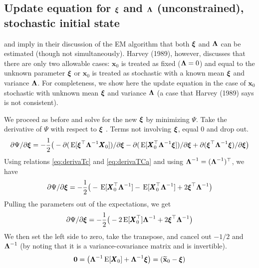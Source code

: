 \documentclass[]{article}
\def\xixi{\mbox{\boldmath $\xi$}}
\def\LAM{\mbox{\boldmath $\Lambda$}}
\def\E{\,\textup{\textrm{E}}}
\def\XX{\mbox{$\pmb{X}$}}	\def\xx{\mbox{$\pmb{x}$}}
\begin{document}
\subsection{Update equation for $\xixi$ and $\LAM$ (unconstrained), stochastic initial state}
\citet{ShumwayStoffer2006} and \citet{GhahramaniHinton1996} imply in their discussion of the EM algorithm that both $\xixi$ and $\LAM$ can be estimated (though not simultaneously).  Harvey (1989), however, discusses that there are only two allowable cases: $\xx_0$ is treated as fixed ($\LAM=0$) and equal to the unknown parameter $\xixi$ or $\xx_0$ is treated as stochastic with a known mean $\xixi$ and variance $\LAM$.  For completeness, we show here the update equation in the case of $\xx_0$ stochastic with unknown mean $\xixi$ and variance $\LAM$ (a case that Harvey (1989) says is not consistent).

We proceed as before and solve for the new $\xixi$ by minimizing $\Psi$.
Take the derivative of $\Psi$  with respect to $\xixi$ .  Terms not involving $\xixi$, equal 0 and drop out.  
\begin{equation}\label{eq:pi.unconstrained1}
\begin{split}
\partial\Psi/\partial\xixi = - \frac{1}{2} \big(-  \partial(\E[\xixi^\top\LAM^{-1}\XX_0])/\partial\xixi 
- \partial(\E[\XX_0^\top\LAM^{-1}\xixi])/\partial\xixi 
 + \partial(\xixi^\top\LAM^{-1}\xixi)/\partial\xixi \big)
\end{split}
\end{equation}
Using relations \eqref{eq:derivaTc} and \eqref{eq:derivaTCa} and using $\LAM^{-1} = (\LAM^{-1})^\top$, we have
\begin{equation}\label{eq:pi.unconstrained2}
\partial\Psi/\partial\xixi = - \frac{1}{2} \big(- \E[ \XX_0^\top\LAM^{-1} ] 
- \E[ \XX_0^\top\LAM^{-1} ] + 2\xixi^\top\LAM^{-1} \big)
\end{equation}
Pulling the parameters out of the expectations, we get
\begin{equation}\label{eq:pi.unconstrained3}
\partial\Psi/\partial\xixi = - \frac{1}{2} \big(- 2\E[ \XX_0^\top ]\LAM^{-1} + 2\xixi^\top\LAM^{-1} \big)
\end{equation}
We then set the left side to zero, take the transpose, and cancel out $-1/2$ and $\LAM^{-1}$ (by noting that it is a variance-covariance matrix and is invertible).   
\begin{equation}\label{eq:pi.unconstrained4}
\mathbf{0} = \big(\LAM^{-1}\E[ \XX_0 ] + \LAM^{-1}\xixi \big)=(\widetilde{\mbox{$\mathbf x$}}_0 - \xixi)
\end{equation}
\end{document}
